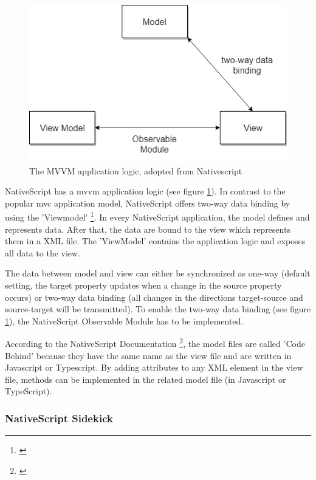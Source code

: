 \begin{figure}[h!]
	\centering
	\includegraphics[width=1\textwidth]{images/mvvm_ns.png}
	\caption{The MVVM application logic, adopted from Nativescript}
	\label{mvvm}
\end{figure}

NativeScript has a \ac{mvvm} application logic (see figure \ref{mvvm}). In contrast to the popular \ac{mvc} application model, NativeScript offers two-way data binding by using the 'Viewmodel' \footnote{\cite{nativescript}}. In every NativeScript application, the model defines and represents data. After that, the data are bound to the view which represents them in a XML file. The 'ViewModel' contains the application logic and exposes all data to the view. 

The data between model and view can either be synchronized as one-way (default setting, the target property updates when a change in the source property occurs) or two-way data binding (all changes in the directions target-source and source-target will be transmitted). To enable the two-way data binding (see figure \ref{mvvm}), the NativeScript Observable Module has to be implemented. 

According to the NativeScript Documentation \footnote{\cite{nativescript}}, the model files are called 'Code Behind' because they have the same name as the view file and are written in Javascript or Typescript. By adding attributes to any XML element in the view file, methods can be implemented in the related model file (in Javascript or TypeScript). 

\subsubsection{NativeScript Sidekick}\label{Native}

